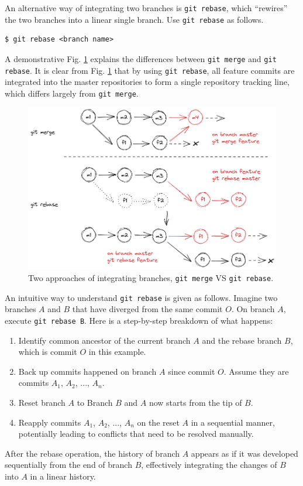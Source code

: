 An alternative way of integrating two branches is \verb|git rebase|, which ``rewires'' the two branches into a linear single branch. Use \verb|git rebase| as follows.
\begin{lstlisting}
$ git rebase <branch name>
\end{lstlisting}
A demonstrative Fig. \ref{ch:sma:fig:gitrebase} explains the differences between \verb|git merge| and \verb|git rebase|. It is clear from Fig. \ref{ch:sma:fig:gitrebase} that by using \verb|git rebase|, all feature commits are integrated into the master repositories to form a single repository tracking line, which differs largely from \verb|git merge|.
\begin{figure}[htbp]
	\centering
	\includegraphics[width=350pt]{chapters/part-3/figures/gitrebase.png}
	\caption{Two approaches of integrating branches, \texttt{git merge} VS \texttt{git rebase}.} \label{ch:sma:fig:gitrebase}
\end{figure}

An intuitive way to understand \verb|git rebase| is given as follows. Imagine two branches $A$ and $B$ that have diverged from the same commit $O$. On branch $A$, execute \verb|git rebase B|. Here is a step-by-step breakdown of what happens:
\begin{enumerate}
	\item Identify common ancestor of the current branch $A$ and the rebase branch $B$, which is commit $O$ in this example.
	\item Back up commits happened on branch $A$ since commit $O$. Assume they are commits $A_1$, $A_2$, ..., $A_n$.
	\item Reset branch $A$ to Branch $B$ and $A$ now starts from the tip of $B$.
	\item Reapply commits $A_1$, $A_2$, ..., $A_n$ on the reset $A$ in a sequential manner, potentially leading to conflicts that need to be resolved manually.
\end{enumerate}
After the rebase operation, the history of branch $A$ appears as if it was developed sequentially from the end of branch $B$, effectively integrating the changes of $B$ into $A$ in a linear history.


